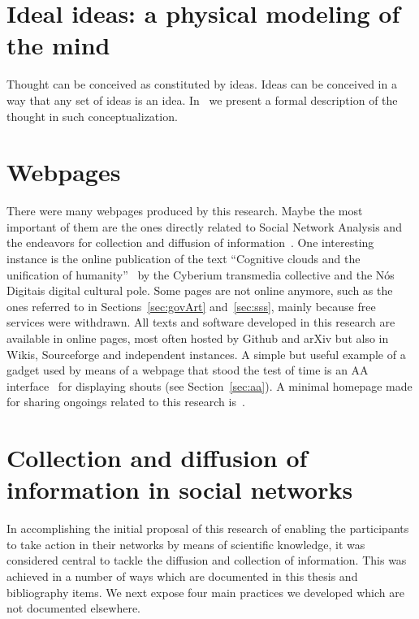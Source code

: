 \begin{apendicesenv}
\section{Ideal ideas: a physical modeling of the mind}
Thought can be conceived as constituted by ideas.
Ideas can be conceived in a way that any set of ideas is an idea.
In~\cite{idealIdeas} we present a formal description of the
thought in such conceptualization.

\section{Webpages}
There were many webpages produced by this research.
Maybe the most important of them are the ones directly related
to Social Network Analysis and the endeavors for collection and diffusion of information~\cite{sfARS,rfARS}.
One interesting instance is the online publication of the text ``Cognitive clouds and the unification of humanity''~\cite{nuvens}
by the Cyberium transmedia collective and the Nós Digitais digital cultural pole.
Some pages are not online anymore, such as the ones referred to in Sections~\ref{sec:govArt} and~\ref{sec:sss},
mainly because free services were withdrawn.
All texts and software developed in this research are available in online pages,
most often hosted by Github and arXiv but also in Wikis, Sourceforge and independent instances.
A simple but useful example of a gadget used by means of a webpage that
stood the test of time is an AA interface~\cite{aaclient} for displaying shouts
(see Section~\ref{sec:aa}).
A minimal homepage made for sharing ongoings related to this research is~\cite{ttmio}.

\section{Collection and diffusion of information in social networks}\label{sec:colDif}
In accomplishing the initial proposal of this research of enabling the participants to take action
in their networks by means of scientific knowledge, it was considered central
to tackle the diffusion and collection of information.
This was achieved in a number of ways which are documented in this thesis and bibliography items.
We next expose four main practices we developed which are not documented elsewhere.


\end{apendicesenv}
